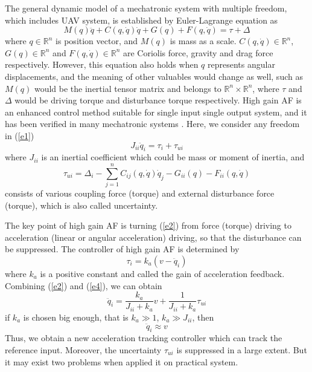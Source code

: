 \documentclass[letterpaper, 10 pt, conference]{ieeeconf}  %
\begin{document}
The general dynamic model of a mechatronic system with multiple freedom, which includes UAV system, is established by Euler-Lagrange equation as
\begin{equation}
    M(q)\ddot{q}+C(q,\dot{q})\dot{q}+G(q)+F(q,\dot{q})=\tau+\Delta 
    \label{e1} 
\end{equation}
where $q\in\mathbb{R}^n$ is position vector, and $M(q)$ is mass as a scale.
$C(q,\dot{q})\in\mathbb{R}^n$, $G(q)\in\mathbb{R}^n$ and $F(q,\dot{q})\in\mathbb{R}^n$ are Coriolis force, gravity and drag force respectively.
However, this equation also holds when $q$ represents angular displacements, and the meaning of other valuables would change as well, such as $M(q)$ would be the inertial tensor matrix and belongs to $\mathbb{R}^n\times\mathbb{R}^n$, where $\tau$ and $\Delta$ would be driving torque and disturbance torque respectively.
High gain AF is an enhanced control method suitable for single input single output system, and it has been verified in many mechatronic systems \cite{Studenny1984,Xu2000,Han2000}. Here, we consider any freedom in (\ref{e1})
\begin{equation}
    J_{ii}\ddot{q}_i = \tau_i + \tau_{ui}
    \label{e2}
\end{equation}
where $J_{ii}$ is an inertial coefficient which could be mass or moment of inertia, and
\begin{equation}
    \tau_{ui}=\Delta_i - \sum_{j=1}^{n}C_{ij}(q,\dot{q})\dot{q}_j - G_{ii}(q) - F_{ii}(q,\dot{q}) 
    \label{e3}
\end{equation}
consists of various coupling force (torque) and external disturbance force (torque), which is also called uncertainty.

The key point of high gain AF is turning (\ref{e2}) from force (torque) driving to acceleration (linear or angular acceleration) driving, so that the disturbance can be suppressed. The controller of high gain AF is determined by
\begin{equation}
    \tau_i=k_a(v-\ddot{q}_i) \label{e4}
\end{equation}
where $k_a$ is a positive constant and called the gain of acceleration feedback.
Combining (\ref{e2}) and (\ref{e4}), we can obtain
\begin{equation}
    \ddot{q}_i=\frac{k_a}{J_{ii}+k_a} v + \frac{1}{J_{ii}+k_a}\tau_{ui} 
    \label{e5}
\end{equation}
if $k_a$ is chosen big enough, that is $k_a\gg 1$, $k_a\gg J_{ii}$, then
\begin{equation}
    \ddot{q}_i\approx v 
    \label{e6}
\end{equation}
Thus, we obtain a new acceleration tracking controller which can track the reference input.
Moreover, the uncertainty $\tau_{ui}$ is suppressed in a large extent.
But it may exist two problems when applied it on practical system.
\end{document}
